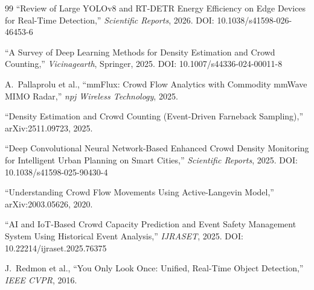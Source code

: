\documentclass[12pt,a4paper]{article}
\begin{document}
\begin{thebibliography}{99}
``Review of Large YOLOv8 and RT-DETR Energy Efficiency on Edge Devices for Real-Time Detection,''
\textit{Scientific Reports}, 2026.
DOI: 10.1038/s41598-026-46453-6

``A Survey of Deep Learning Methods for Density Estimation and Crowd Counting,''
\textit{Vicinagearth}, Springer, 2025.
DOI: 10.1007/s44336-024-00011-8

A.~Pallaprolu et al., ``mmFlux: Crowd Flow Analytics with Commodity mmWave MIMO Radar,''
\textit{npj Wireless Technology}, 2025.

``Density Estimation and Crowd Counting (Event-Driven Farneback Sampling),''
arXiv:2511.09723, 2025.

``Deep Convolutional Neural Network-Based Enhanced Crowd Density Monitoring for Intelligent Urban Planning on Smart Cities,''
\textit{Scientific Reports}, 2025.
DOI: 10.1038/s41598-025-90430-4

``Understanding Crowd Flow Movements Using Active-Langevin Model,''
arXiv:2003.05626, 2020.

``AI and IoT-Based Crowd Capacity Prediction and Event Safety Management System Using Historical Event Analysis,''
\textit{IJRASET}, 2025.
DOI: 10.22214/ijraset.2025.76375

J.~Redmon et al., ``You Only Look Once: Unified, Real-Time Object Detection,''
\textit{IEEE CVPR}, 2016.

\end{thebibliography}
\end{document}
